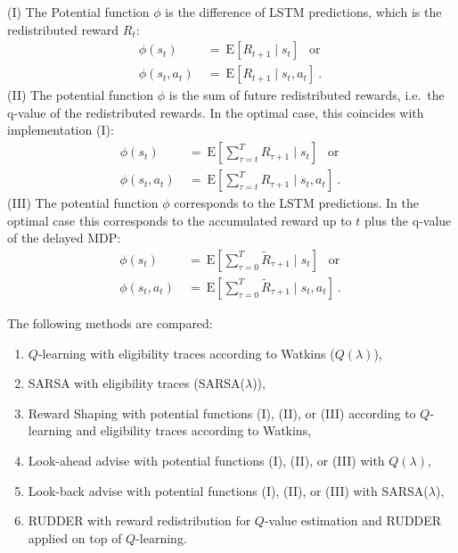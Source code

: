 \documentclass{article}
\newcommand\EXP{\mathbf{\mathrm{E}}}
\begin{document}
\begin{appendices}
(I) The Potential function $\phi$ is the difference of LSTM predictions, 
which is the redistributed reward $R_t$:
\begin{align}
    \phi (s_t) \ &= \ \EXP \left[ R_{t+1} \mid s_t \right]\ \ \mbox{ or } \\ 
    \phi (s_t,a_t) \ &= \ \EXP \left[ R_{t+1} \mid s_t , a_t \right] \ .
\end{align}
(II) The potential function $\phi$ is the sum of 
future redistributed rewards, i.e.\ 
the q-value of the redistributed rewards. 
In the optimal case, this coincides with implementation (I):
\begin{align}
    \phi (s_t) \ &= \ \EXP  \left[ \sum^{T}_{\tau = t} R_{\tau +1} \mid s_t \right] 
    \ \ \mbox{ or } \\  
    \phi (s_t,a_t) \ &= \ \EXP  \left[ \sum^{T}_{\tau = t} R_{\tau+1} \mid s_t, a_t \right] \ .
\end{align}
(III) The potential function $\phi$ corresponds to the LSTM predictions. In the optimal case this corresponds
to the accumulated reward up to $t$ plus the q-value of the delayed MDP:
\begin{align}
    \phi (s_t) \ &= \ \EXP  \left[ \sum^{T}_{\tau = 0} \tilde{R}_{\tau +1} \mid s_t \right] 
    \ \ \mbox{ or } \\ 
    \phi (s_t,a_t) \ &= \ \EXP  \left[ \sum^{T}_{\tau = 0} \tilde{R}_{\tau+1} \mid s_t, a_t \right] \ .
\end{align}




The following methods are compared:
\begin{enumerate}
    \item $Q$-learning with eligibility traces according to Watkins ($Q(\lambda)$), 
    \item SARSA with eligibility traces (SARSA($\lambda$)),
    \item Reward Shaping with potential functions (I), (II), or (III) 
    according to $Q$-learning and eligibility traces according to Watkins,
    \item Look-ahead advise with potential functions (I), (II), or (III) 
    with $Q(\lambda)$,
    \item Look-back advise with potential functions (I), (II), or (III) 
    with SARSA($\lambda$),
    \item RUDDER with reward redistribution for $Q$-value estimation and RUDDER applied on top of $Q$-learning.
\end{enumerate}


\end{appendices}
\end{document}
